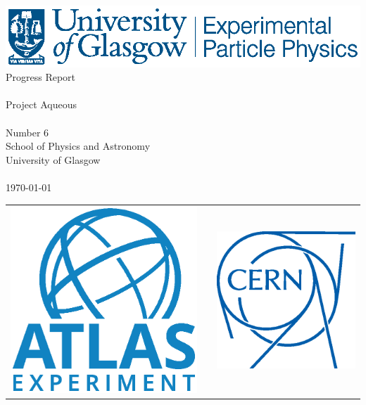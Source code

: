 \edef\titlePage{0} %
\ifcase\titlePage %
    \thispagestyle{empty}
    \begin{center}
        \includegraphics[height=3 cm]{images/ExperPartPhys_blue.eps}
        \vspace{3.0 cm}\\
        {\LARGE
        Progress Report\\
        \mbox{}\\
        Project Aqueous}\\
        \vspace{1.0 cm}
        \mbox{}\\
        \large Number 6\\
        \vspace{\fill}
        \vspace{\fill}
        School of Physics and Astronomy\\
        University of Glasgow\\
        \mbox{}\\
        \timeC\today
        \mbox{}\\
        \vspace{\fill}
        \begin{tabular}{cp{4.9 cm}c}
        \includegraphics[height=2.4 cm]{images/ATLAS-Logo-Square-Blue-RGB.eps}&&\includegraphics[height=2.4 cm]{images/CERN_LogoOutline.eps}\\
        \end{tabular}
        \vspace{\fill}
    \end{center}
\or
\fi

